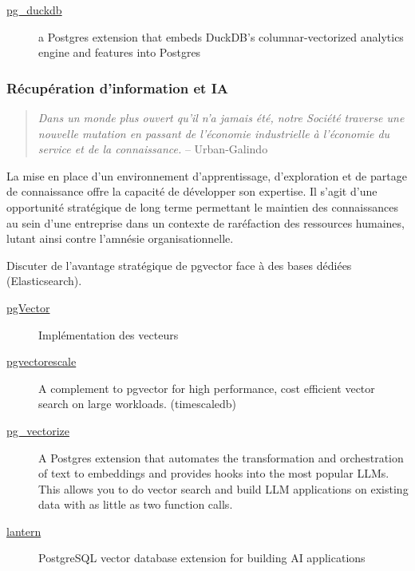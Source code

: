 \documentclass[a4paper,12pt]{article}
\begin{document}
\begin{multicols*}{2}
\begin{description}
\item[{\href{https://github.com/duckdb/pg\_duckdb}{pg\_duckdb}}] a Postgres extension that embeds DuckDB's columnar-vectorized analytics engine and features into Postgres
\end{description}
\subsubsection*{Récupération d'information et IA}
\label{sec:orgb01d90a}
\begin{quote}
\emph{Dans un monde plus ouvert qu’il n’a jamais été, notre Société traverse une nouvelle mutation en passant de l’économie industrielle à l’économie du service et de la connaissance.} -- Urban-Galindo\autocite{jean-jacquesurban-galindoGestionConfigurationIngenierie2008}
\end{quote}

La mise en place d’un environnement d’apprentissage, d’exploration et de partage de connaissance offre la capacité de développer son expertise. \autocite{vidicKnowledgeAssetCompetitive2022} Il s’agit d’une opportunité stratégique de long terme permettant le maintien des connaissances au sein d’une entreprise dans un contexte de raréfaction des ressources humaines,\autocite{thoumsinQuellesStrategiesFautil2019} lutant ainsi contre l’amnésie organisationnelle.\autocite{lucierivardCycleRetentionConnaissances2010}

Discuter de l’avantage stratégique de pgvector face à des bases dédiées (Elasticsearch).

\begin{description}
\item[{\href{https://github.com/pgvector/pgvector}{pgVector}}] Implémentation des vecteurs
\item[{\href{https://github.com/timescale/pgvectorscale}{pgvectorescale}}] A complement to pgvector for high performance, cost efficient vector search on large workloads. (timescaledb)
\item[{\href{https://github.com/tembo-io/pg\_vectorize}{pg\_vectorize}}] A Postgres extension that automates the transformation and orchestration of text to embeddings and provides hooks into the most popular LLMs. This allows you to do vector search and build LLM applications on existing data with as little as two function calls.
\item[{\href{https://github.com/lanterndata/lantern}{lantern}}] PostgreSQL vector database extension for building AI applications
\end{description}


\end{multicols*}
\end{document}
